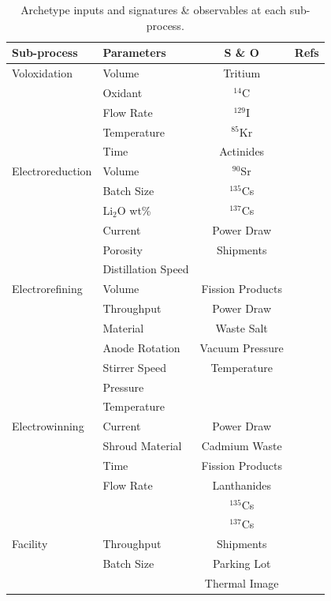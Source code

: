 \documentclass{anstrans}
\begin{document}
\begin{table}[h]
	\centering
	\begin{tabularx}{0.5\textwidth}{llcr}
		\hline
		\textbf{Sub-process} & \textbf{Parameters} & \textbf{S \& O} & \textbf{Refs} \\
		\hline
		Voloxidation & Volume & Tritium & \cite{jubin_spent_2009} \\
		& Oxidant & $^{14}$C & \cite{flowsheet_1998} \\
		& Flow Rate &  $^{129}$I &  \\
		& Temperature & $^{85}$Kr &  \\
		& Time & Actinides & \\ \hline
		Electroreduction & Volume & $^{90}$Sr & \cite{Borrelli_2017} \\
		& Batch Size & $^{135}$Cs & \cite{flowsheet_1998} \\
		& Li$_2$O wt\% & $^{137}$Cs & \cite{choi_electrochemical_2015} \\
		& Current & Power Draw & \cite{lee_korean_2011} \\
		& Porosity & Shipments & \cite{lee_modeling_2016} \\
		& Distillation Speed & & \\ \hline
		Electrorefining & Volume & Fission Products & \cite{lee_advanced_2008} \\
		& Throughput & Power Draw & \cite{lee_korean_2011} \\
		& Material & Waste Salt & \cite{flowsheet_1998} \\
		& Anode Rotation & Vacuum Pressure & \cite{koyama_development_2012} \\
		& Stirrer Speed & Temperature & \cite{kim_development_2013} \\
		& Pressure &  & \\
		& Temperature & & \\ \hline
		Electrowinning & Current & Power Draw & \cite{flowsheet_1998} \\
		& Shroud Material & Cadmium Waste & \cite{lee_korean_2011} \\
		& Time & Fission Products & \cite{Borrelli_2017} \\
		& Flow Rate & Lanthanides & \\
		&  & $^{135}$Cs & \\
		&  & $^{137}$Cs & \\ \hline
		Facility & Throughput & Shipments & \\
		& Batch Size & Parking Lot & \\
		& & Thermal Image & \\
		\hline
	\end{tabularx}
	\caption {Archetype inputs and signatures \& observables at each sub-process.}
	\label {tab:params}
\end{table}
\end{document}
